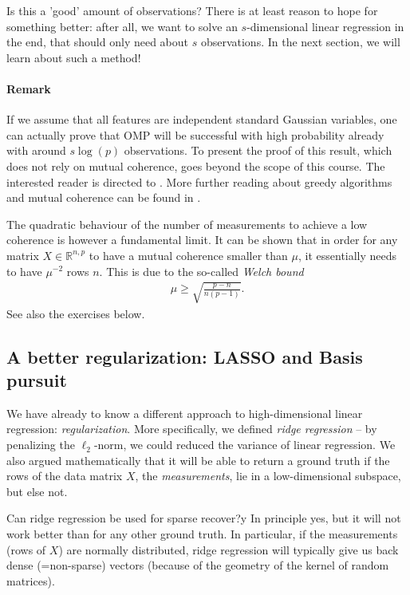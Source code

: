 \documentclass{article}
\newcommand{\R}{\mathbb{R}}
\begin{document}
Is this a 'good' amount of observations? There is at least reason to hope for something better:  after all, we want to solve an $s$-dimensional linear regression in the end, that should only need about $s$ observations. In the next section, we will learn about such a method!

\paragraph{Remark} If we assume that all features are independent standard Gaussian variables, one can actually prove that OMP will be successful with high probability already with around $s\log(p)$ observations. To present the proof of this result, which does not rely on mutual coherence, goes beyond the scope of this course. The interested reader is directed to \cite{tropp2007signal}. More further reading about greedy algorithms and mutual coherence can be found in \cite[Ch.3,5]{FouRau2013}.

The quadratic behaviour of the number of measurements to achieve a low coherence is however a fundamental limit. It can be shown that in order for any matrix $X\in \R^{n,p}$ to have a mutual coherence smaller than $\mu$, it essentially needs to have $\mu^{-2}$ rows $n$. This is due to the so-called \emph{Welch bound} \cite{WelchBound}
\begin{align*}
    \mu \geq \sqrt{\frac{p-n}{n(p-1)}}.
\end{align*}
See also the exercises below.

\subsection{A better regularization: LASSO and Basis pursuit}
We have already to know a different approach to high-dimensional linear regression: \emph{regularization}. More specifically, we defined \emph{ridge regression} -- by penalizing the $\ell_2$-norm, we could reduced the variance of linear regression. We also argued mathematically that it will be able to return a ground truth if the rows of the data matrix $X$, the \emph{measurements}, lie in a low-dimensional subspace, but else not.

Can ridge regression be used for sparse recover?y In principle yes, but it will not work better than for any other ground truth. In particular, if the measurements (rows of $X$) are normally distributed, ridge regression will typically give us back dense (=non-sparse) vectors (because of the geometry of the kernel of random matrices). 
\end{document}
